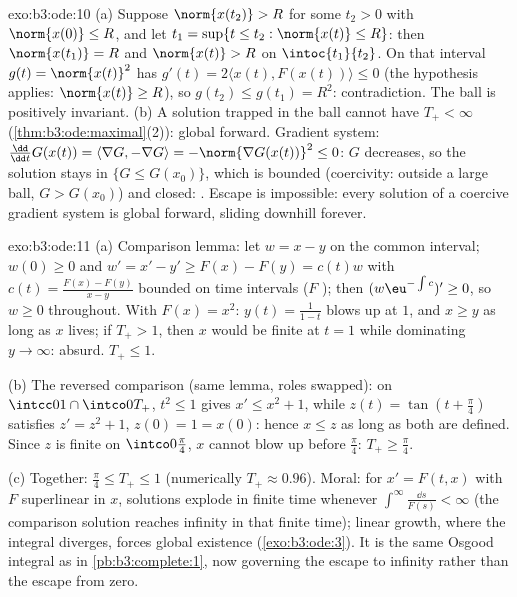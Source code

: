 \begin{solution}{exo:b3:ode:10}
(a) Suppose $\norm{x(t_2)} > R$ for some $t_2 > 0$ with
$\norm{x(0)} \leq R$, and let $t_1 = \sup\{t \leq t_2 :
\norm{x(t)} \leq R\}$: then $\norm{x(t_1)} = R$ and
$\norm{x(t)} > R$ on $\intoc{t_1}{t_2}$. On that interval
$g(t) = \norm{x(t)}^2$ has $g'(t) = 2\langle x(t),
F(x(t))\rangle \leq 0$ (the hypothesis applies: $\norm{x(t)}
\geq R$), so $g(t_2) \leq g(t_1) = R^2$: contradiction. The
ball is positively invariant.
(b) A solution trapped in the  ball cannot have
$T_+ < \infty$ (\cref{thm:b3:ode:maximal}(2)): global
forward. Gradient system: $\frac{\dd}{\dd t}G(x(t)) =
\langle\nabla G, -\nabla G\rangle = -\norm{\nabla G(x(t))}^2
\leq 0$: $G$ decreases, so the solution stays in $\{G \leq
G(x_0)\}$, which is bounded (coercivity: outside a large
ball, $G > G(x_0)$) and closed: . Escape is
impossible: every solution of a coercive gradient system is
global forward, sliding downhill forever.
\end{solution}

\begin{solution}{exo:b3:ode:11}
(a) Comparison lemma: let $w = x - y$ on the common
interval; $w(0) \geq 0$ and $w' = x' - y' \geq F(x) - F(y) =
c(t)w$ with $c(t) = \frac{F(x) - F(y)}{x - y}$ bounded on
 time intervals ($F$ ); then
$(w\eu^{-\int c})' \geq 0$, so $w \geq 0$ throughout. With
$F(x) = x^2$: $y(t) = \frac1{1 - t}$ blows up at $1$, and $x
\geq y$ as long as $x$ lives; if $T_+ > 1$, then $x$ would
be finite at $t = 1$ while dominating $y \to \infty$:
absurd. $T_+ \leq 1$.

(b) The reversed comparison (same lemma, roles swapped):
on $\intcc01\cap\intco0{T_+}$, $t^2 \leq 1$ gives $x' \leq
x^2 + 1$, while $z(t) = \tan(t + \frac\pi4)$ satisfies $z' =
z^2 + 1$, $z(0) = 1 = x(0)$: hence $x \leq z$ as long as
both are defined. Since $z$ is finite on
$\intco0{\frac\pi4}$, $x$ cannot blow up before
$\frac\pi4$: $T_+ \geq \frac\pi4$.

(c) Together: $\frac\pi4 \leq T_+ \leq 1$ (numerically $T_+
\approx 0.96$). Moral: for $x' = F(t, x)$ with $F$
superlinear in $x$, solutions explode in finite time
whenever $\int^\infty\frac{\dd s}{F(s)} < \infty$ (the
comparison solution reaches infinity in that finite time);
linear growth, where the integral diverges, forces global
existence (\cref{exo:b3:ode:3}). It is the same Osgood
integral as in \cref{pb:b3:complete:1}, now governing the
escape to infinity rather than the escape from zero.
\end{solution}

